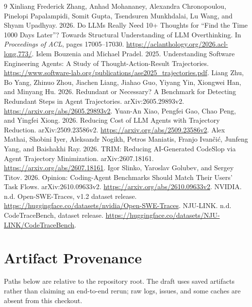 \documentclass[10pt,a4paper,twocolumn]{article}
\begin{document}
\begin{thebibliography}{9}
\small
{}
Xinliang Frederick Zhang, Anhad Mohananey, Alexandra Chronopoulou, Pinelopi Papalampidi, Somit Gupta, Tsendsuren Munkhdalai, Lu Wang, and Shyam Upadhyay. 2026.
\newblock Do LLMs Really Need 10+ Thoughts for ``Find the Time 1000 Days Later''? Towards Structural Understanding of LLM Overthinking.
\newblock In \emph{Proceedings of ACL}, pages 17005--17030. \url{https://aclanthology.org/2026.acl-long.773/}.
Islem Bouzenia and Michael Pradel. 2025.
\newblock Understanding Software Engineering Agents: A Study of Thought-Action-Result Trajectories.
\newblock \url{https://www.software-lab.org/publications/ase2025_trajectories.pdf}.
Liang Zhu, Bo Yang, Zhinuo Zhou, Jiachen Liang, Jiahao Guo, Yiyang Yin, Xiongwei Han, and Minyang Hu. 2026.
\newblock Redundant or Necessary? A Benchmark for Detecting Redundant Steps in Agent Trajectories.
\newblock arXiv:2605.29893v2. \url{https://arxiv.org/abs/2605.29893v2}.
Yuan-An Xiao, Pengfei Gao, Chao Peng, and Yingfei Xiong. 2026.
\newblock Reducing Cost of LLM Agents with Trajectory Reduction.
\newblock arXiv:2509.23586v2. \url{https://arxiv.org/abs/2509.23586v2}.
Alex Mathai, Shobini Iyer, Aleksandr Nogikh, Petros Maniatis, Franjo Ivan\v{c}i\'{c}, Junfeng Yang, and Baishakhi Ray. 2026.
\newblock TRIM: Reducing AI-Generated CodeSlop via Agent Trajectory Minimization.
\newblock arXiv:2607.18161. \url{https://arxiv.org/abs/2607.18161}.
Igor Slinko, Yaroslav Golubev, and Sergey Titov. 2026.
\newblock Opinion: Coding-Agent Benchmarks Should Match Their Users' Task Flows.
\newblock arXiv:2610.09633v2. \url{https://arxiv.org/abs/2610.09633v2}.
NVIDIA. n.d. Open-SWE-Traces, v1.2 dataset release.
\newblock \url{https://huggingface.co/datasets/nvidia/Open-SWE-Traces}.
NJU-LINK. n.d. CodeTraceBench, dataset release.
\newblock \url{https://huggingface.co/datasets/NJU-LINK/CodeTraceBench}.
\end{thebibliography}
\clearpage
\appendix
\section{Artifact Provenance}
Paths below are relative to the repository root. The draft uses saved artifacts rather than claiming an end-to-end rerun; raw logs, issues, and some caches are absent from this checkout.
\end{document}
